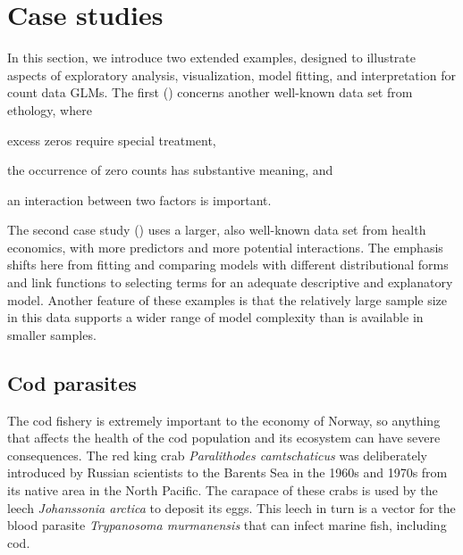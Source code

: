 \documentclass[11pt]{book}\usepackage[]{graphicx}\usepackage[]{color}
\begin{document}

\section{Case studies}\label{sec:glm-casestudies}
In this section, we introduce two extended examples, designed to illustrate aspects of
exploratory analysis, visualization, model fitting, and interpretation for count data GLMs.
The first ()
concerns another well-known data set from ethology, where
\begin{seriate}
\item excess zeros require special treatment,
\item the occurrence of zero counts has substantive meaning, and
\item an interaction between two factors is important.
\end{seriate}

The second case study ()
uses a larger, also well-known
data set from health economics, with more predictors and more
potential interactions. The emphasis shifts here from fitting and comparing models with
different distributional forms and link functions to selecting terms for an adequate descriptive
and explanatory model. Another feature of these examples is that the relatively large sample size
in this data supports a wider range of model complexity than is available in smaller samples.


\subsection{Cod parasites}\label{sec:glm-case-cod}
The cod fishery is extremely important to the economy of Norway, so anything that affects the
health of the cod population and its ecosystem can have severe consequences.
The red king crab \emph{Paralithodes camtschaticus} was deliberately introduced by Russian scientists
to the Barents Sea in the 1960s and 1970s from its native area in the North Pacific. The carapace of these crabs is used by the leech \emph{Johanssonia arctica} to deposit its eggs. This leech in turn is a vector for the blood parasite
\emph{Trypanosoma murmanensis} that can infect marine fish, including cod.
\end{document}
